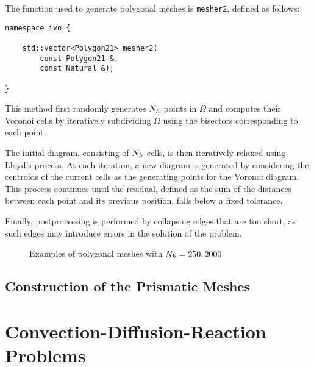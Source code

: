 The function used to generate polygonal meshes is \lstinline{mesher2}, defined as follows:

\begin{lstlisting}[style=cpp]
namespace ivo {

    std::vector<Polygon21> mesher2(
        const Polygon21 &, 
        const Natural &);

}
\end{lstlisting}

This method first randomly generates $N_h$ points in $\Omega$ and computes their Voronoi cells by iteratively subdividing $\Omega$ using the bisectors corresponding to each point.

The initial diagram, consisting of $N_h$ cells, is then iteratively relaxed using Lloyd's process. At each iteration, a new diagram is generated by considering the centroids of the current cells as the generating points for the Voronoi diagram. This process continues until the residual, defined as the sum of the distances between each point and its previous position, falls below a fixed tolerance.

Finally, postprocessing is performed by collapsing edges that are too short, as such edges may introduce errors in the solution of the problem.

\begin{figure}[!ht]
    \begin{subfigure}[b]{0.49\textwidth}
		\centering
        
    \end{subfigure}
	\hfill
    \begin{subfigure}[b]{0.49\textwidth}
		\centering
        
    \end{subfigure}
    \caption{Examples of polygonal meshes with $N_h = 250, 2000$}
\end{figure}

\subsection{Construction of the Prismatic Meshes}



\newpage
\section{Convection-Diffusion-Reaction Problems}


